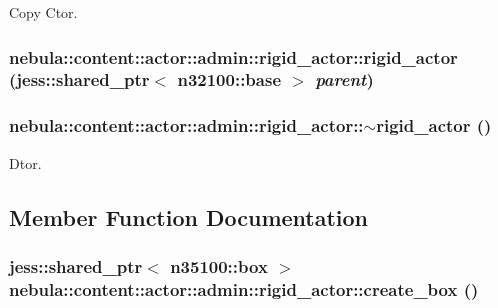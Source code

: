 Copy Ctor. \hypertarget{classnebula_1_1content_1_1actor_1_1admin_1_1rigid__actor_a3c5294dcb0d95c48a2e7beb085c9033f}{
\subsubsection[{rigid\_\-actor}]{\setlength{\rightskip}{0pt plus 5cm}nebula::content::actor::admin::rigid\_\-actor::rigid\_\-actor (jess::shared\_\-ptr$<$ {\bf n32100::base} $>$ {\em parent})}}
\label{classnebula_1_1content_1_1actor_1_1admin_1_1rigid__actor_a3c5294dcb0d95c48a2e7beb085c9033f}
\hypertarget{classnebula_1_1content_1_1actor_1_1admin_1_1rigid__actor_a017c413b639fea45c3910321289613d8}{
\subsubsection[{$\sim$rigid\_\-actor}]{\setlength{\rightskip}{0pt plus 5cm}nebula::content::actor::admin::rigid\_\-actor::$\sim$rigid\_\-actor ()}}
\label{classnebula_1_1content_1_1actor_1_1admin_1_1rigid__actor_a017c413b639fea45c3910321289613d8}


Dtor. 

\subsection{Member Function Documentation}
\hypertarget{classnebula_1_1content_1_1actor_1_1admin_1_1rigid__actor_a7c5527f3ee596106a7b8b8f68953c820}{
\subsubsection[{create\_\-box}]{\setlength{\rightskip}{0pt plus 5cm}jess::shared\_\-ptr$<$ {\bf n35100::box} $>$ nebula::content::actor::admin::rigid\_\-actor::create\_\-box ()}}
\label{classnebula_1_1content_1_1actor_1_1admin_1_1rigid__actor_a7c5527f3ee596106a7b8b8f68953c820}


